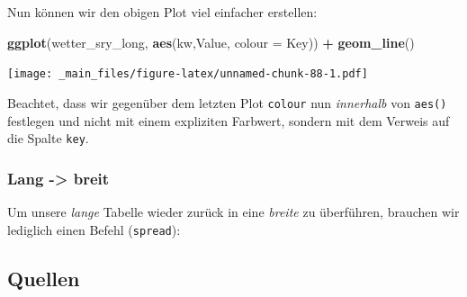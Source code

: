 \documentclass[]{book}
\newenvironment{Shaded}{\begin{snugshade}}{\end{snugshade}}
\newcommand{\CommentTok}[1]{\textcolor[rgb]{0.56,0.35,0.01}{\textit{#1}}}
\newcommand{\DataTypeTok}[1]{\textcolor[rgb]{0.13,0.29,0.53}{#1}}
\newcommand{\KeywordTok}[1]{\textcolor[rgb]{0.13,0.29,0.53}{\textbf{#1}}}
\newcommand{\NormalTok}[1]{#1}
\newcommand{\OperatorTok}[1]{\textcolor[rgb]{0.81,0.36,0.00}{\textbf{#1}}}
\newcommand{\StringTok}[1]{\textcolor[rgb]{0.31,0.60,0.02}{#1}}
\begin{document}
Nun können wir den obigen Plot viel einfacher erstellen:

\begin{Shaded}
\begin{Highlighting}[]
\KeywordTok{ggplot}\NormalTok{(wetter_sry_long, }\KeywordTok{aes}\NormalTok{(kw,Value, }\DataTypeTok{colour =}\NormalTok{ Key)) }\OperatorTok{+}
\StringTok{  }\KeywordTok{geom_line}\NormalTok{()}
\end{Highlighting}
\end{Shaded}

\texttt{[image: \_main\_files/figure-latex/unnamed-chunk-88-1.pdf]}

Beachtet, dass wir gegenüber dem letzten Plot \texttt{colour} nun \emph{innerhalb} von \texttt{aes()} festlegen und nicht mit einem expliziten Farbwert, sondern mit dem Verweis auf die Spalte \texttt{key}.

\hypertarget{lang---breit}{%
\subsubsection{Lang -\textgreater{} breit}\label{lang---breit}}

Um unsere \emph{lange} Tabelle wieder zurück in eine \emph{breite} zu überführen, brauchen wir lediglich einen Befehl (\texttt{spread}):

\begin{Shaded}
\end{Shaded}

\hypertarget{quellen-1}{%
\subsection{Quellen}\label{quellen-1}}
\end{document}
